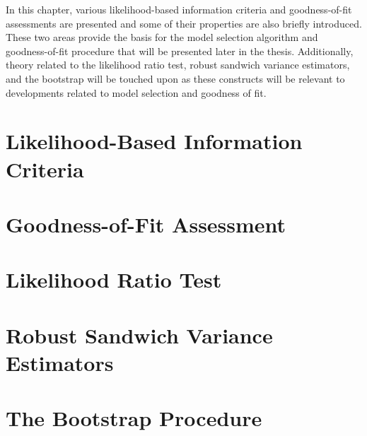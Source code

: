 \doublespace
{}
		In this chapter, various likelihood-based information criteria and goodness-of-fit assessments are presented and some of their properties are also briefly introduced.
		These two areas provide the basis for the model selection algorithm and goodness-of-fit procedure that will be presented later in the thesis. Additionally, theory
		related to the likelihood ratio test, robust sandwich variance estimators, and the bootstrap will be touched upon as these constructs will be relevant to developments
		related to model selection and goodness of fit.
		
		\section{Likelihood-Based Information Criteria}
		
		\section{Goodness-of-Fit Assessment}

		\section{Likelihood Ratio Test}

		\section{Robust Sandwich Variance Estimators}

		\section{The Bootstrap Procedure}
		
